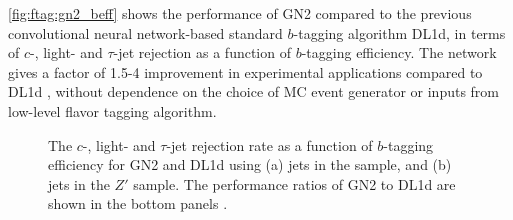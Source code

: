 \documentclass[../thesis.tex]{subfiles}
\begin{document}
\autoref{fig:ftag:gn2_beff} shows the performance of GN2 compared to the previous convolutional neural network-based standard $b$-tagging algorithm DL1d, in terms of $c$-, light- and $\tau$-jet rejection as a function of $b$-tagging efficiency. The network gives a factor of 1.5-4 improvement in experimental applications compared to DL1d \citep{ftag:gn2}, without dependence on the choice of MC event generator or inputs from low-level flavor tagging algorithm.

\begin{figure}[!htb]
\centering
{}
\caption[The $c$-, light- and $\tau$-jet rejection rate as a function of $b$-tagging efficiency for GN2 and DL1d using (a) jets in the \ttbar sample, and (b) jets in the $Z'$ sample. The performance ratios of GN2 to DL1d are shown in the bottom panels.]{\label{fig:ftag:gn2_beff}The $c$-, light- and $\tau$-jet rejection rate as a function of $b$-tagging efficiency for GN2 and DL1d using (a) jets in the \ttbar sample, and (b) jets in the $Z'$ sample. The performance ratios of GN2 to DL1d are shown in the bottom panels \citep{ftag:gn2}.}
\end{figure}
\end{document}
